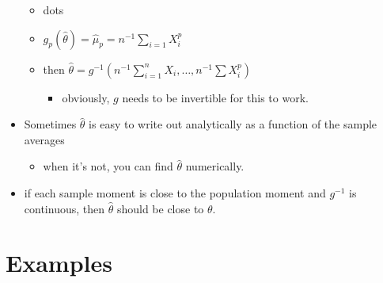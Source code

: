 \documentclass[11pt]{article}
\begin{document}
\begin{itemize}
\begin{itemize}
\item dots
\item $g_p(\hat\theta) = \hat\mu_p = n^{-1}\sum_{i=1} X_i^p$
\item then $\hat\theta = g^{-1}(n^{-1}\sum_{i=1}^n
        X_i,\dots,n^{-1}\sum X_i^p)$
\begin{itemize}
\item obviously, $g$ needs to be invertible for this to work.
\end{itemize}
\end{itemize}
\item Sometimes $\hat\theta$ is easy to write out analytically as a
      function of the sample averages
\begin{itemize}
\item when it's not, you can find $\hat \theta$ numerically.
\end{itemize}
\item if each sample moment is close to the population moment and
      $g^{-1}$ is continuous, then $\hat\theta$ should be close to $\theta$.
\end{itemize}
\section{Examples}
\label{sec-2}
\end{document}
